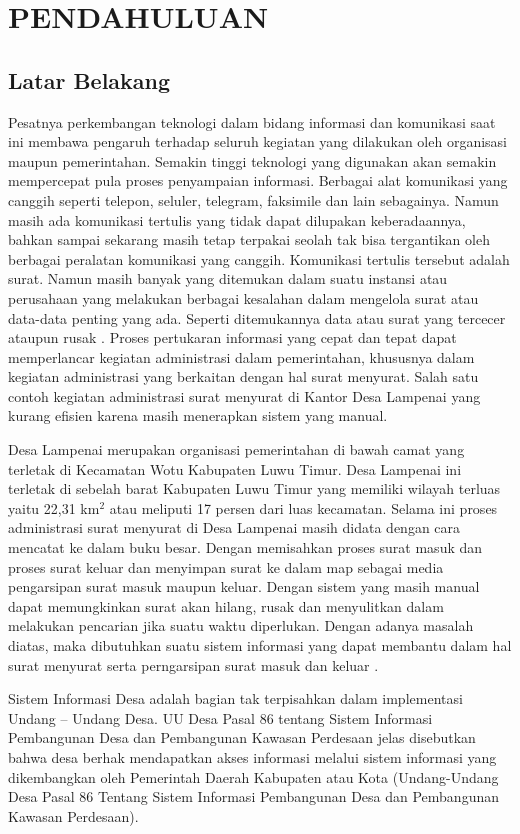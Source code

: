 \chapter{PENDAHULUAN}

\section{Latar Belakang}

Pesatnya perkembangan teknologi dalam bidang informasi dan komunikasi saat ini membawa pengaruh terhadap seluruh kegiatan yang dilakukan oleh organisasi maupun pemerintahan. Semakin tinggi teknologi yang digunakan akan semakin mempercepat pula proses penyampaian informasi. Berbagai alat komunikasi yang canggih seperti telepon, seluler, telegram, faksimile dan lain sebagainya. Namun masih ada komunikasi tertulis yang tidak dapat dilupakan keberadaannya, bahkan sampai sekarang masih tetap terpakai seolah tak bisa tergantikan oleh berbagai peralatan komunikasi yang canggih. Komunikasi tertulis tersebut adalah surat. Namun masih banyak yang ditemukan dalam suatu instansi atau perusahaan yang melakukan berbagai kesalahan dalam mengelola surat atau data-data penting yang ada. Seperti ditemukannya data atau surat yang tercecer ataupun rusak . Proses pertukaran informasi yang cepat dan tepat dapat memperlancar kegiatan administrasi dalam pemerintahan, khususnya dalam kegiatan administrasi yang berkaitan dengan hal surat menyurat. Salah satu contoh kegiatan administrasi surat menyurat di Kantor Desa Lampenai yang kurang efisien karena masih menerapkan sistem yang manual.

Desa Lampenai merupakan organisasi pemerintahan di bawah camat yang terletak di Kecamatan Wotu Kabupaten Luwu Timur. Desa Lampenai ini terletak di sebelah barat Kabupaten Luwu Timur yang memiliki wilayah terluas yaitu 22,31 km$^2$ atau meliputi 17 persen dari luas kecamatan. Selama ini proses administrasi surat menyurat di Desa Lampenai masih didata dengan cara mencatat ke dalam buku besar. Dengan memisahkan proses surat masuk dan proses surat keluar dan menyimpan surat ke dalam map sebagai media pengarsipan surat masuk maupun keluar. Dengan sistem yang masih manual dapat memungkinkan surat akan hilang, rusak dan menyulitkan dalam melakukan pencarian jika suatu waktu diperlukan. Dengan adanya masalah diatas, maka dibutuhkan suatu sistem informasi yang dapat membantu dalam hal surat menyurat serta perngarsipan surat masuk dan keluar .

Sistem Informasi Desa adalah bagian tak terpisahkan dalam implementasi Undang – Undang Desa. UU Desa Pasal 86 tentang Sistem Informasi Pembangunan Desa dan Pembangunan Kawasan Perdesaan jelas disebutkan bahwa desa berhak mendapatkan akses informasi melalui sistem informasi yang dikembangkan oleh Pemerintah Daerah Kabupaten atau Kota (Undang-Undang Desa Pasal 86 Tentang Sistem Informasi Pembangunan Desa dan Pembangunan Kawasan Perdesaan).

